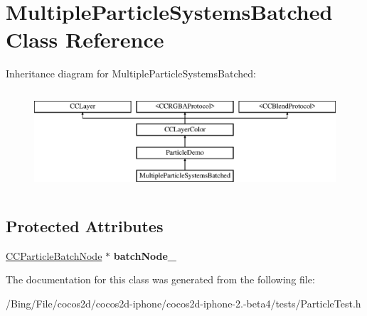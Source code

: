 \hypertarget{interface_multiple_particle_systems_batched}{\section{Multiple\-Particle\-Systems\-Batched Class Reference}
\label{interface_multiple_particle_systems_batched}
}
Inheritance diagram for Multiple\-Particle\-Systems\-Batched\-:\begin{figure}[H]
\begin{center}
\leavevmode
\includegraphics[height=3.752094cm]{interface_multiple_particle_systems_batched}
\end{center}
\end{figure}
\subsection*{Protected Attributes}
\begin{DoxyCompactItemize}
\item 
\hypertarget{interface_multiple_particle_systems_batched_ad854167846e6704c798717b86aaeebb5}{\hyperlink{interface_c_c_particle_batch_node}{C\-C\-Particle\-Batch\-Node} $\ast$ {\bfseries batch\-Node\-\_\-}}\label{interface_multiple_particle_systems_batched_ad854167846e6704c798717b86aaeebb5}

\end{DoxyCompactItemize}


The documentation for this class was generated from the following file\-:\begin{DoxyCompactItemize}
\item 
/\-Bing/\-File/cocos2d/cocos2d-\/iphone/cocos2d-\/iphone-\/2.-\/beta4/tests/Particle\-Test.\-h\end{DoxyCompactItemize}
